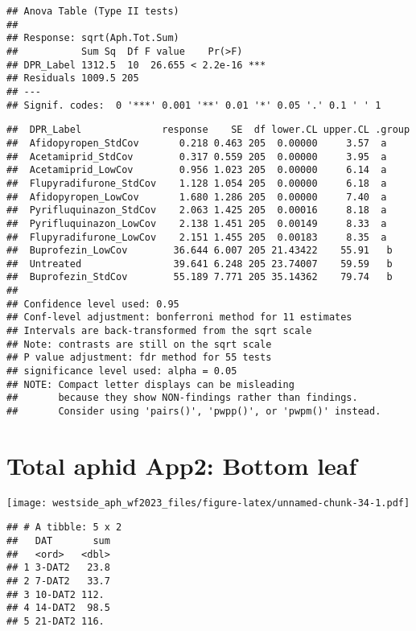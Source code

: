 \documentclass[
]{article}
\begin{document}
\begin{verbatim}
## Anova Table (Type II tests)
## 
## Response: sqrt(Aph.Tot.Sum)
##           Sum Sq  Df F value    Pr(>F)    
## DPR_Label 1312.5  10  26.655 < 2.2e-16 ***
## Residuals 1009.5 205                      
## ---
## Signif. codes:  0 '***' 0.001 '**' 0.01 '*' 0.05 '.' 0.1 ' ' 1
\end{verbatim}

\begin{verbatim}
##  DPR_Label              response    SE  df lower.CL upper.CL .group
##  Afidopyropen_StdCov       0.218 0.463 205  0.00000     3.57  a    
##  Acetamiprid_StdCov        0.317 0.559 205  0.00000     3.95  a    
##  Acetamiprid_LowCov        0.956 1.023 205  0.00000     6.14  a    
##  Flupyradifurone_StdCov    1.128 1.054 205  0.00000     6.18  a    
##  Afidopyropen_LowCov       1.680 1.286 205  0.00000     7.40  a    
##  Pyrifluquinazon_StdCov    2.063 1.425 205  0.00016     8.18  a    
##  Pyrifluquinazon_LowCov    2.138 1.451 205  0.00149     8.33  a    
##  Flupyradifurone_LowCov    2.151 1.455 205  0.00183     8.35  a    
##  Buprofezin_LowCov        36.644 6.007 205 21.43422    55.91   b   
##  Untreated                39.641 6.248 205 23.74007    59.59   b   
##  Buprofezin_StdCov        55.189 7.771 205 35.14362    79.74   b   
## 
## Confidence level used: 0.95 
## Conf-level adjustment: bonferroni method for 11 estimates 
## Intervals are back-transformed from the sqrt scale 
## Note: contrasts are still on the sqrt scale 
## P value adjustment: fdr method for 55 tests 
## significance level used: alpha = 0.05 
## NOTE: Compact letter displays can be misleading
##       because they show NON-findings rather than findings.
##       Consider using 'pairs()', 'pwpp()', or 'pwpm()' instead.
\end{verbatim}

\hypertarget{total-aphid-app2-bottom-leaf-1}{%
\section{Total aphid App2: Bottom
leaf}\label{total-aphid-app2-bottom-leaf-1}}

\texttt{[image: westside\_aph\_wf2023\_files/figure-latex/unnamed-chunk-34-1.pdf]}

\begin{verbatim}
## # A tibble: 5 x 2
##   DAT       sum
##   <ord>   <dbl>
## 1 3-DAT2   23.8
## 2 7-DAT2   33.7
## 3 10-DAT2 112. 
## 4 14-DAT2  98.5
## 5 21-DAT2 116.
\end{verbatim}
\end{document}
